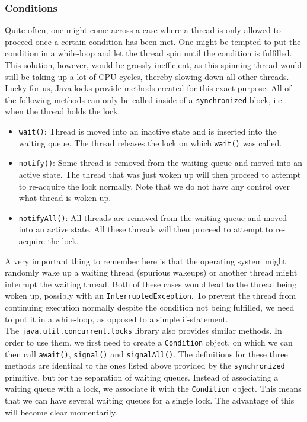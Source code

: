 \documentclass[main]{subfiles}
\begin{document}
\subsubsection{Conditions}
Quite often, one might come across a case where a thread is only allowed to proceed once a certain condition has been met. One might be tempted to put the condition in a while-loop and let the thread spin until the condition is fulfilled. This solution, however, would be grossly inefficient, as this spinning thread would still be taking up a lot of CPU cycles, thereby slowing down all other threads.\\[3mm]
Lucky for us, Java locks provide methods created for this exact purpose. All of the following methods can only be called inside of a \texttt{synchronized} block, i.e. when the thread holds the lock.
\begin{itemize}
    \item \texttt{wait()}: Thread is moved into an inactive state and is inserted into the waiting queue. The thread releases the lock on which \texttt{wait()} was called.
    \item \texttt{notify()}: Some thread is removed from the waiting queue and moved into an active state. The thread that was just woken up will then proceed to attempt to re-acquire the lock normally. Note that we do not have any control over what thread is woken up.
    \item \texttt{notifyAll()}: All threads are removed from the waiting queue and moved into an active state. All these threads will then proceed to attempt to re-acquire the lock.
\end{itemize}
A very important thing to remember here is that the operating system might randomly wake up a waiting thread (spurious wakeups) or another thread might interrupt the waiting thread. Both of these cases would lead to the thread being woken up, possibly with an \texttt{InterruptedException}. To prevent the thread from continuing execution normally despite the condition not being fulfilled, we need to put it in a while-loop, as opposed to a simple if-statement.\\[3mm]
The \texttt{java.util.concurrent.locks} library also provides similar methods. In order to use them, we first need to create a \texttt{Condition} object, on which we can then call \texttt{await()}, \texttt{signal()} and \texttt{signalAll()}. The definitions for these three methods are identical to the ones listed above provided by the \texttt{synchronized} primitive, but for the separation of waiting queues. Instead of associating a waiting queue with a lock, we associate it with the \texttt{Condition} object. This means that we can have several waiting queues for a single lock. The advantage of this will become clear momentarily.\\[3mm]
\end{document}
